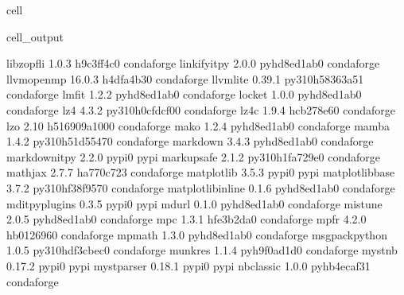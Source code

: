 \documentclass[letterpaper,table,10pt,english]{jupyterBook}
\begin{document}
\begin{sphinxuseclass}{cell}
\begin{sphinxVerbatimOutput}
\begin{sphinxuseclass}{cell_output}
\begin{sphinxVerbatim}[commandchars=\\\{\}]
libzopfli                 1.0.3                h9c3ff4c\PYGZus{}0    conda\PYGZhy{}forge
linkify\PYGZhy{}it\PYGZhy{}py             2.0.0              pyhd8ed1ab\PYGZus{}0    conda\PYGZhy{}forge
llvm\PYGZhy{}openmp               16.0.3               h4dfa4b3\PYGZus{}0    conda\PYGZhy{}forge
llvmlite                  0.39.1          py310h58363a5\PYGZus{}1    conda\PYGZhy{}forge
lmfit                     1.2.2              pyhd8ed1ab\PYGZus{}0    conda\PYGZhy{}forge
locket                    1.0.0              pyhd8ed1ab\PYGZus{}0    conda\PYGZhy{}forge
lz4                       4.3.2           py310h0cfdcf0\PYGZus{}0    conda\PYGZhy{}forge
lz4\PYGZhy{}c                     1.9.4                hcb278e6\PYGZus{}0    conda\PYGZhy{}forge
lzo                       2.10              h516909a\PYGZus{}1000    conda\PYGZhy{}forge
mako                      1.2.4              pyhd8ed1ab\PYGZus{}0    conda\PYGZhy{}forge
mamba                     1.4.2           py310h51d5547\PYGZus{}0    conda\PYGZhy{}forge
markdown                  3.4.3              pyhd8ed1ab\PYGZus{}0    conda\PYGZhy{}forge
markdown\PYGZhy{}it\PYGZhy{}py            2.2.0                    pypi\PYGZus{}0    pypi
markupsafe                2.1.2           py310h1fa729e\PYGZus{}0    conda\PYGZhy{}forge
mathjax                   2.7.7                ha770c72\PYGZus{}3    conda\PYGZhy{}forge
matplotlib                3.5.3                    pypi\PYGZus{}0    pypi
matplotlib\PYGZhy{}base           3.7.2           py310hf38f957\PYGZus{}0    conda\PYGZhy{}forge
matplotlib\PYGZhy{}inline         0.1.6              pyhd8ed1ab\PYGZus{}0    conda\PYGZhy{}forge
mdit\PYGZhy{}py\PYGZhy{}plugins           0.3.5                    pypi\PYGZus{}0    pypi
mdurl                     0.1.0              pyhd8ed1ab\PYGZus{}0    conda\PYGZhy{}forge
mistune                   2.0.5              pyhd8ed1ab\PYGZus{}0    conda\PYGZhy{}forge
mpc                       1.3.1                hfe3b2da\PYGZus{}0    conda\PYGZhy{}forge
mpfr                      4.2.0                hb012696\PYGZus{}0    conda\PYGZhy{}forge
mpmath                    1.3.0              pyhd8ed1ab\PYGZus{}0    conda\PYGZhy{}forge
msgpack\PYGZhy{}python            1.0.5           py310hdf3cbec\PYGZus{}0    conda\PYGZhy{}forge
munkres                   1.1.4              pyh9f0ad1d\PYGZus{}0    conda\PYGZhy{}forge
myst\PYGZhy{}nb                   0.17.2                   pypi\PYGZus{}0    pypi
myst\PYGZhy{}parser               0.18.1                   pypi\PYGZus{}0    pypi
nbclassic                 1.0.0              pyhb4ecaf3\PYGZus{}1    conda\PYGZhy{}forge

\end{sphinxVerbatim}
\end{sphinxuseclass}
\end{sphinxVerbatimOutput}
\end{sphinxuseclass}
\end{document}
